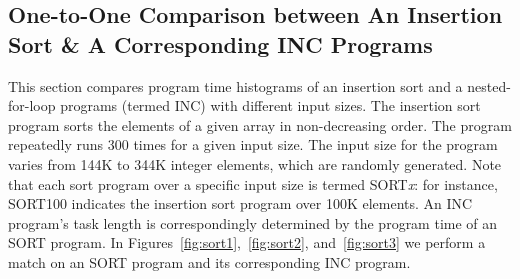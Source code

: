 \documentclass[10pt]{article}
\begin{document}
\clearpage
\pagebreak

\subsection{One-to-One Comparison between An Insertion Sort \& A Corresponding INC Programs~\label{sec:sort}} 
This section compares program time histograms 
of an insertion sort and a nested-for-loop programs (termed INC) with different input sizes. The insertion sort program sorts the elements of a given array in non-decreasing order.  The program repeatedly runs 300 times for a given input size. The input size for the program varies from 144K to 344K integer elements, which are randomly generated. Note that each sort program over a specific input size is termed SORT{\it x}: for instance, SORT100 indicates the insertion sort program over 100K elements. An INC program's task length is correspondingly determined by the program time of an SORT program. In Figures~\ref{fig:sort1},~\ref{fig:sort2}, and~\ref{fig:sort3} 
we perform a match on an SORT program and its corresponding INC program.

%
\end{document}

